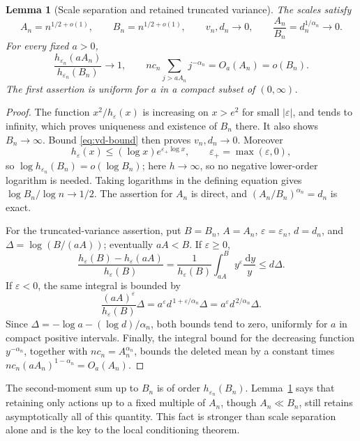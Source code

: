 \documentclass[11pt,a4paper]{article}
\numberwithin{equation}{section}
\newtheorem{lemma}[theorem]{Lemma}
\theoremstyle{definition}
\theoremstyle{remark}
\newcommand{\eps}{\varepsilon}
\newcommand{\dd}{\,\mathrm d}
\begin{document}
\begin{lemma}[Scale separation and retained truncated variance]
\label{lem:scales}
The scales satisfy
\begin{equation}
 A_n=n^{1/2+o(1)},\qquad B_n=n^{1/2+o(1)},\qquad
 v_n,d_n\to0,\qquad \frac{A_n}{B_n}=d_n^{1/\alpha_n}\to0.
 \label{eq:scale-separation}
\end{equation}
For every fixed \(a>0\),
\begin{equation}
 \frac{h_{\eps_n}(aA_n)}{h_{\eps_n}(B_n)}\longrightarrow1,
 \qquad
 nc_n\sum_{j>aA_n}j^{-\alpha_n}=O_a(A_n)=o(B_n).
 \label{eq:truncated-variance}
\end{equation}
The first assertion is uniform for \(a\) in a compact subset of \((0,\infty)\).
\end{lemma}
\begin{proof}
The function \(x^2/h_\eps(x)\) is increasing on \(x>e^2\) for small
\(|\eps|\), and tends to infinity, which proves uniqueness and existence of
\(B_n\) there. It also shows \(B_n\to\infty\). Bound
\eqref{eq:vd-bound} then proves \(v_n,d_n\to0\). Moreover
\[
 h_\eps(x)\le(\log x)e^{\eps_+\log x},\qquad \eps_+=\max(\eps,0),
\]
so \(\log h_{\eps_n}(B_n)=o(\log B_n)\); here \(h\to\infty\), so no
negative lower-order logarithm is needed. Taking logarithms in the defining
equation gives \(\log B_n/\log n\to1/2\). The assertion for \(A_n\) is
direct, and \((A_n/B_n)^{\alpha_n}=d_n\) is exact.

For the truncated-variance assertion, put \(B=B_n\), \(A=A_n\),
\(\eps=\eps_n\), \(d=d_n\), and
\(\Delta=\log(B/(aA))\); eventually \(aA<B\). If \(\eps\ge0\),
\[
 \frac{h_\eps(B)-h_\eps(aA)}{h_\eps(B)}
 =\frac1{h_\eps(B)}\int_{aA}^B y^\eps\frac{\dd y}{y}
 \le d\Delta.
\]
If \(\eps<0\), the same integral is bounded by
\[
 \frac{(aA)^\eps}{h_\eps(B)}\Delta
 =a^\eps d^{\,1+\eps/\alpha_n}\Delta
 =a^\eps d^{\,2/\alpha_n}\Delta.
\]
Since \(\Delta=-\log a-(\log d)/\alpha_n\), both bounds tend to zero,
uniformly for \(a\) in compact positive intervals. Finally, the integral
bound for the decreasing function \(y^{-\alpha_n}\), together with
\(nc_n=A_n^{\alpha_n}\), bounds the deleted mean by a constant times
\(nc_n(aA_n)^{1-\alpha_n}=O_a(A_n)\).
\end{proof}

The second-moment sum up to \(B_n\) is of order \(h_{\eps_n}(B_n)\).
Lemma~\ref{lem:scales} says that retaining only actions up to a fixed multiple
of \(A_n\), though \(A_n\ll B_n\), still retains asymptotically all of this
quantity. This fact is stronger than scale separation alone and is the key
to the local conditioning theorem.
\end{document}
